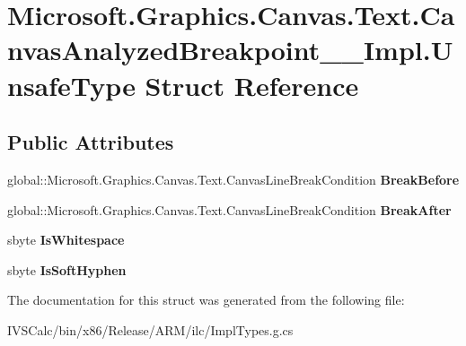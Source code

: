 \hypertarget{struct_microsoft_1_1_graphics_1_1_canvas_1_1_text_1_1_canvas_analyzed_breakpoint_____impl_1_1_unsafe_type}{}\section{Microsoft.\+Graphics.\+Canvas.\+Text.\+Canvas\+Analyzed\+Breakpoint\+\_\+\+\_\+\+Impl.\+Unsafe\+Type Struct Reference}
\label{struct_microsoft_1_1_graphics_1_1_canvas_1_1_text_1_1_canvas_analyzed_breakpoint_____impl_1_1_unsafe_type}
\subsection*{Public Attributes}
\begin{DoxyCompactItemize}
\item 
\mbox{\label{struct_microsoft_1_1_graphics_1_1_canvas_1_1_text_1_1_canvas_analyzed_breakpoint_____impl_1_1_unsafe_type_a5d51c747041228f7c90643783d5d871f}} 
global\+::\+Microsoft.\+Graphics.\+Canvas.\+Text.\+Canvas\+Line\+Break\+Condition {\bfseries Break\+Before}
\item 
\mbox{\label{struct_microsoft_1_1_graphics_1_1_canvas_1_1_text_1_1_canvas_analyzed_breakpoint_____impl_1_1_unsafe_type_ad7f8a3849396fd296a3f9b086a12691a}} 
global\+::\+Microsoft.\+Graphics.\+Canvas.\+Text.\+Canvas\+Line\+Break\+Condition {\bfseries Break\+After}
\item 
\mbox{\label{struct_microsoft_1_1_graphics_1_1_canvas_1_1_text_1_1_canvas_analyzed_breakpoint_____impl_1_1_unsafe_type_aed3b6e375494e1c3b7e603aceb38cc11}} 
sbyte {\bfseries Is\+Whitespace}
\item 
\mbox{\label{struct_microsoft_1_1_graphics_1_1_canvas_1_1_text_1_1_canvas_analyzed_breakpoint_____impl_1_1_unsafe_type_a5287b4215cec3f3e2517673b271f2947}} 
sbyte {\bfseries Is\+Soft\+Hyphen}
\end{DoxyCompactItemize}


The documentation for this struct was generated from the following file\+:\begin{DoxyCompactItemize}
\item 
I\+V\+S\+Calc/bin/x86/\+Release/\+A\+R\+M/ilc/Impl\+Types.\+g.\+cs\end{DoxyCompactItemize}
